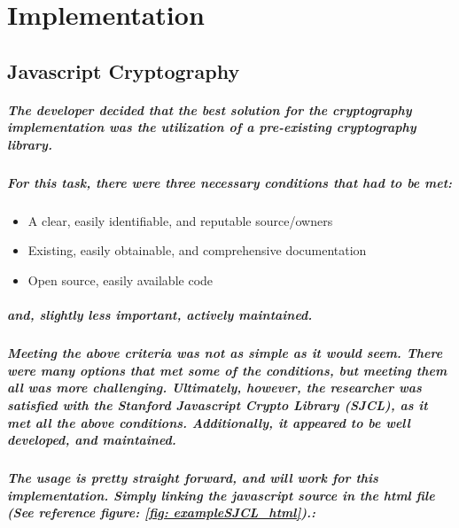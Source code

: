 \chapter{Implementation}

\section{Javascript Cryptography}

\paragraph{The developer decided that the best solution for the cryptography implementation was the utilization of a pre-existing cryptography library.}

\paragraph{For this task, there were three necessary conditions that had to be met:}

\begin{itemize}
\item A clear, easily identifiable, and reputable source/owners
\item Existing, easily obtainable, and comprehensive documentation
\item Open source, easily available code
\end{itemize}

\paragraph{and, slightly less important, actively maintained.}

\paragraph{Meeting the above criteria was not as simple as it would seem. There were many options that met some of the conditions, but meeting them all was more challenging. Ultimately, however, the researcher was satisfied with the Stanford Javascript Crypto Library (SJCL), as it met all the above conditions. Additionally, it appeared to be well developed, and maintained.}\cite[Website]{SJCL}

\paragraph{The usage is pretty straight forward, and will work for this implementation. Simply linking the javascript source in the html file (See reference figure: \ref{fig: exampleSJCL_html}).:}

